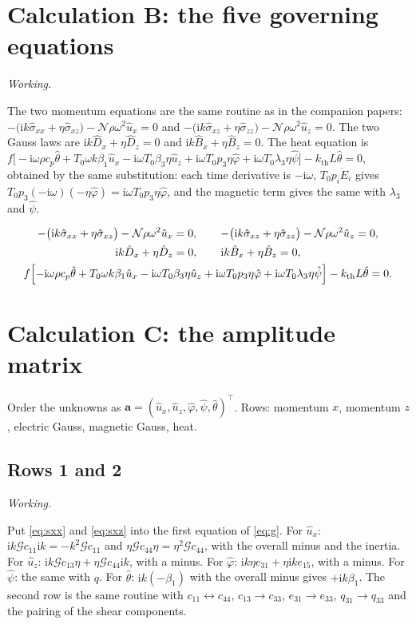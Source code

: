 \documentclass[11pt,a4paper]{article}
\newif\ifshowworked \showworkedtrue
\newenvironment{worked}{\ifshowworked\par\smallskip\noindent\textit{Working.}\par\else\setbox0\vbox\bgroup\fi}{\ifshowworked\par\smallskip\else\egroup\fi}
\newcommand{\Nc}{\mathcal{N}}
\newcommand{\Gc}{\mathcal{G}}
\newcommand{\ii}{\mathrm{i}}
\newcommand{\bx}{\hat u_x}
\newcommand{\bz}{\hat u_z}
\newcommand{\bp}{\hat\varphi}
\newcommand{\bpsi}{\hat\psi}
\newcommand{\bt}{\hat\theta}
\newcommand{\kB}{k_{\mathrm{th}}}
\begin{document}
\section{Calculation B: the five governing equations}\label{sec:B}

\begin{worked}
The two momentum equations are the same routine as in the companion papers:
$-\bigl(\ii k\hat\sigma_{xx}+\eta\hat\sigma_{xz}\bigr)-\Nc\rho\omega^2\bx=0$ and
$-\bigl(\ii k\hat\sigma_{xz}+\eta\hat\sigma_{zz}\bigr)-\Nc\rho\omega^2\bz=0$. The two Gauss laws are
$\ii k\hat D_x+\eta\hat D_z=0$ and $\ii k\hat B_x+\eta\hat B_z=0$. The heat equation is
$f\bigl[-\ii\omega\rho c_p\bt+T_0\omega k\beta_1\bx-\ii\omega T_0\beta_3\eta\bz
+\ii\omega T_0p_3\eta\bp+\ii\omega T_0\lambda_3\eta\bpsi\bigr]-\kB L\bt=0$, obtained by the same
substitution: each time derivative is $-\ii\omega$, $T_0p_i\dot E_i$ gives
$T_0p_3(-\ii\omega)(-\eta\bp)=\ii\omega T_0p_3\eta\bp$, and the magnetic term gives the same with
$\lambda_3$ and $\bpsi$.
\end{worked}

\noindent
\begin{equation}\label{eq:g}
\begin{gathered}
-\bigl(\ii k\hat\sigma_{xx}+\eta\hat\sigma_{xz}\bigr)-\Nc\rho\omega^2\bx=0,\qquad
-\bigl(\ii k\hat\sigma_{xz}+\eta\hat\sigma_{zz}\bigr)-\Nc\rho\omega^2\bz=0,\\
\ii k\hat D_x+\eta\hat D_z=0,\qquad \ii k\hat B_x+\eta\hat B_z=0,\\
f\Bigl[-\ii\omega\rho c_p\bt+T_0\omega k\beta_1\bx-\ii\omega T_0\beta_3\eta\bz
+\ii\omega T_0p_3\eta\bp+\ii\omega T_0\lambda_3\eta\bpsi\Bigr]-\kB L\bt=0 .
\end{gathered}
\end{equation}

\section{Calculation C: the amplitude matrix}\label{sec:C}

Order the unknowns as $\mathbf a=(\bx,\bz,\bp,\bpsi,\bt)^{\top}$. Rows: momentum $x$, momentum $z$,
electric Gauss, magnetic Gauss, heat.

\subsection{Rows 1 and 2}

\begin{worked}
Put \eqref{eq:sxx} and \eqref{eq:sxz} into the first equation of \eqref{eq:g}. For $\bx$:
$\ii k\Gc c_{11}\ii k=-k^2\Gc c_{11}$ and $\eta\Gc c_{44}\eta=\eta^2\Gc c_{44}$, with the overall minus and
the inertia. For $\bz$: $\ii k\Gc c_{13}\eta+\eta\Gc c_{44}\ii k$, with a minus. For $\bp$:
$\ii k\eta e_{31}+\eta\ii ke_{15}$, with a minus. For $\bpsi$: the same with $q$. For $\bt$:
$\ii k(-\beta_1)$ with the overall minus gives $+\ii k\beta_1$. The second row is the same routine with
$c_{11}\leftrightarrow c_{44}$, $c_{13}\to c_{33}$, $e_{31}\to e_{33}$, $q_{31}\to q_{33}$ and the pairing
of the shear components.
\end{worked}
\end{document}
